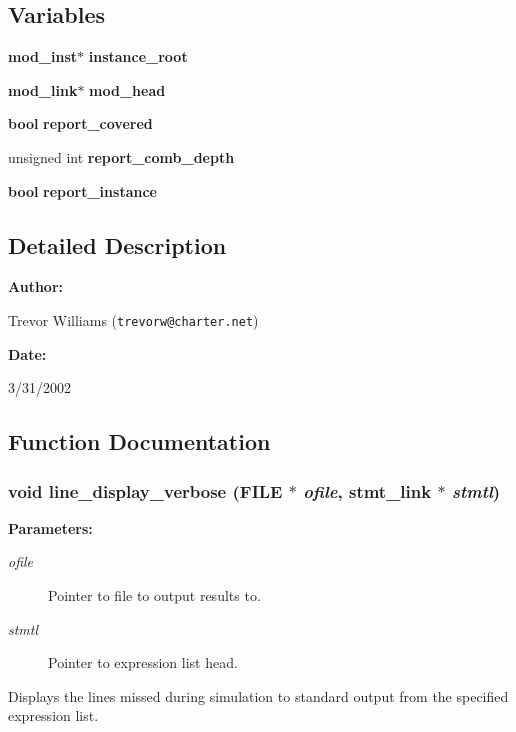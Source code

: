 \subsection*{Variables}
\begin{CompactItemize}
\item 
{\bf mod\_\-inst}$\ast$ {\bf instance\_\-root}
\item 
{\bf mod\_\-link}$\ast$ {\bf mod\_\-head}
\item 
{\bf bool} {\bf report\_\-covered}
\item 
unsigned int {\bf report\_\-comb\_\-depth}
\item 
{\bf bool} {\bf report\_\-instance}
\end{CompactItemize}


\subsection{Detailed Description}


\begin{Desc}
\item[{\bf Author: }]\par
Trevor Williams ({\tt trevorw@charter.net}) \end{Desc}
\begin{Desc}
\item[{\bf Date: }]\par
3/31/2002

\end{Desc}


\subsection{Function Documentation}
\subsubsection{\setlength{\rightskip}{0pt plus 5cm}void line\_\-display\_\-verbose (FILE $\ast$ {\em ofile}, {\bf stmt\_\-link} $\ast$ {\em stmtl})}\label{line_8c_a8}


\begin{Desc}
\item[{\bf Parameters: }]\par
\begin{description}
\item[
{\em ofile}]Pointer to file to output results to. \item[
{\em stmtl}]Pointer to expression list head.

\end{description}
\end{Desc}
Displays the lines missed during simulation to standard output from the specified expression list. 
